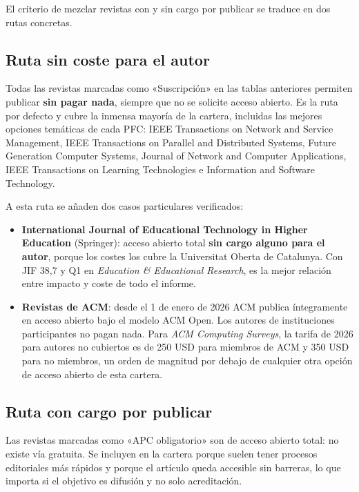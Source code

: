 \documentclass[11pt,a4paper]{article}
\begin{document}
El criterio de mezclar revistas con y sin cargo por publicar se traduce en dos rutas concretas.

\subsection{Ruta sin coste para el autor}

Todas las revistas marcadas como «Suscripción» en las tablas anteriores permiten publicar \textbf{sin pagar nada}, siempre que no se solicite acceso abierto. Es la ruta por defecto y cubre la inmensa mayoría de la cartera, incluidas las mejores opciones temáticas de cada PFC: IEEE Transactions on Network and Service Management, IEEE Transactions on Parallel and Distributed Systems, Future Generation Computer Systems, Journal of Network and Computer Applications, IEEE Transactions on Learning Technologies e Information and Software Technology.

A esta ruta se añaden dos casos particulares verificados:

\begin{itemize}[leftmargin=*,itemsep=4pt]
	\item \textbf{International Journal of Educational Technology in Higher Education} (Springer): acceso abierto total \textbf{sin cargo alguno para el autor}, porque los costes los cubre la Universitat Oberta de Catalunya. Con JIF 38,7 y Q1 en \emph{Education \& Educational Research}, es la mejor relación entre impacto y coste de todo el informe.
	\item \textbf{Revistas de ACM}: desde el 1 de enero de 2026 ACM publica íntegramente en acceso abierto bajo el modelo ACM Open. Los autores de instituciones participantes no pagan nada. Para \emph{ACM Computing Surveys}, la tarifa de 2026 para autores no cubiertos es de 250 USD para miembros de ACM y 350 USD para no miembros, un orden de magnitud por debajo de cualquier otra opción de acceso abierto de esta cartera.
\end{itemize}

\subsection{Ruta con cargo por publicar}

Las revistas marcadas como «APC obligatorio» son de acceso abierto total: no existe vía gratuita. Se incluyen en la cartera porque suelen tener procesos editoriales más rápidos y porque el artículo queda accesible sin barreras, lo que importa si el objetivo es difusión y no solo acreditación.
\end{document}
